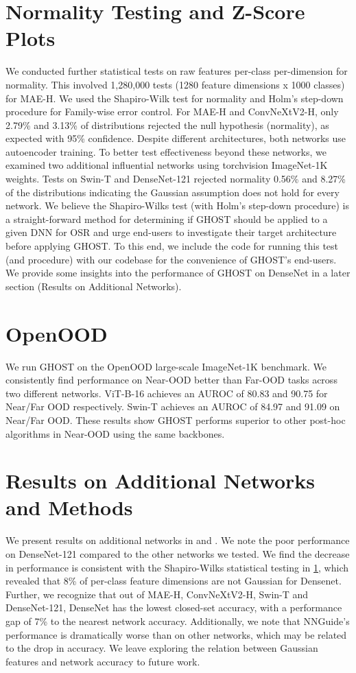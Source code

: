 \section{Normality Testing and Z-Score Plots}
\label{shapiro}
We conducted further statistical tests on raw features per-class per-dimension for normality. 
This involved 1,280,000 tests (1280 feature dimensions x 1000 classes) for MAE-H. 
We used the Shapiro-Wilk test for normality and Holm's step-down procedure for Family-wise error control. 
For MAE-H and ConvNeXtV2-H, only 2.79\% and 3.13\% of distributions rejected the null hypothesis (normality), as expected with 95\% confidence. 
Despite different architectures, both networks use autoencoder training. 
To better test effectiveness beyond these networks, we examined two additional influential networks using torchvision ImageNet-1K weights. 
Tests on Swin-T and DenseNet-121 rejected normality 0.56\% and 8.27\% of the distributions indicating the Gaussian assumption does not hold for every network. 
We believe the Shapiro-Wilks test (with Holm's step-down procedure) is a straight-forward method for determining if GHOST should be applied to a given DNN for OSR and urge end-users to investigate their target architecture before applying GHOST.
To this end, we include the code for running this test (and procedure) with our codebase for the convenience of GHOST's end-users.
We provide some insights into the performance of GHOST on DenseNet in a later section (Results on Additional Networks).

\section{OpenOOD}
\label{sec:openood}
We run GHOST on the OpenOOD large-scale ImageNet-1K benchmark.
We consistently find performance on Near-OOD better than Far-OOD tasks across two different networks.
ViT-B-16 achieves an AUROC of 80.83 and 90.75 for Near/Far OOD respectively.
Swin-T achieves an AUROC of 84.97 and 91.09 on Near/Far OOD.
These results show GHOST performs superior to other post-hoc algorithms in Near-OOD using the same backbones. 



\section{Results on Additional Networks and Methods}
\label{additional_networks}
We present results on additional networks in  and .
We note the poor performance on DenseNet-121 compared to the other networks we tested.
We find the decrease in performance is consistent with the Shapiro-Wilks statistical testing in \ref{shapiro}, which revealed that 8\% of per-class feature dimensions are not Gaussian for Densenet. 
Further, we recognize that out of MAE-H, ConvNeXtV2-H, Swin-T and DenseNet-121, DenseNet has the lowest closed-set accuracy, with a performance gap of 7\% to the nearest network accuracy. 
Additionally, we note that NNGuide's performance is dramatically worse than on other networks, which may be related to the drop in accuracy.
We leave exploring the relation between Gaussian features and network accuracy to future work.

